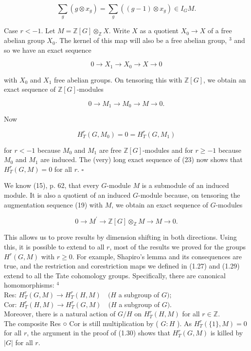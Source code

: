\documentclass[10pt]{article}
\begin{document}
$$
\sum_{g}\left(g \otimes x_{g}\right)=\sum_{g}\left((g-1) \otimes x_{g}\right) \in I_{G} M .
$$

Case $r<-1$. Let $M=\mathbb{Z}[G] \otimes_{\mathbb{Z}} X$. Write $X$ as a quotient $X_{0} \rightarrow X$ of a free abelian group $X_{0}$. The kernel of this map will also be a free abelian group, ${ }^{3}$ and so we have an exact sequence

$$
0 \rightarrow X_{1} \rightarrow X_{0} \rightarrow X \rightarrow 0
$$

with $X_{0}$ and $X_{1}$ free abelian groups. On tensoring this with $\mathbb{Z}[G]$, we obtain an exact sequence of $\mathbb{Z}[G]$-modules


\begin{equation*}
0 \rightarrow M_{1} \rightarrow M_{0} \rightarrow M \rightarrow 0 . \tag{23}
\end{equation*}


Now

$$
H_{T}^{r}\left(G, M_{0}\right)=0=H_{T}^{r}\left(G, M_{1}\right)
$$

for $r<-1$ because $M_{0}$ and $M_{1}$ are free $\mathbb{Z}[G]$-modules and for $r \geq-1$ because $M_{0}$ and $M_{1}$ are induced. The (very) long exact sequence of (23) now shows that $H_{T}^{r}(G, M)=0$ for all $r$. \(\square\)

We know (15), p. 62, that every $G$-module $M$ is a submodule of an induced module. It is also a quotient of an induced $G$-module because, on tensoring the augmentation sequence (19) with $M$, we obtain an exact sequence of $G$-modules

$$
0 \rightarrow M^{\prime} \rightarrow \mathbb{Z}[G] \otimes_{\mathbb{Z}} M \rightarrow M \rightarrow 0 .
$$

This allows us to prove results by dimension shifting in both directions. Using this, it is possible to extend to all $r$, most of the results we proved for the groups $H^{r}(G, M)$ with $r \geq 0$. For example, Shapiro's lemma and its consequences are true, and the restriction and corestriction maps we defined in (1.27) and (1.29) extend to all the Tate cohomology groups. Specifically, there are canonical homomorphisms: ${ }^{4}$\\
Res: $H_{T}^{r}(G, M) \rightarrow H_{T}^{r}(H, M) \quad(H$ a subgroup of $G) ;$\\
Cor: $H_{T}^{r}(H, M) \rightarrow H_{T}^{r}(G, M) \quad(H$ a subgroup of $G)$.\\
Moreover, there is a natural action of $G / H$ on $H_{T}^{r}(H, M)$ for all $r \in \mathbb{Z}$.\\
The composite Res ○ Cor is still multiplication by ( $G: H$ ). As $H_{T}^{r}(\{1\}, M)=0$ for all $r$, the argument in the proof of (1.30) shows that $H_{T}^{r}(G, M)$ is killed by $|G|$ for all $r$.
\end{document}
